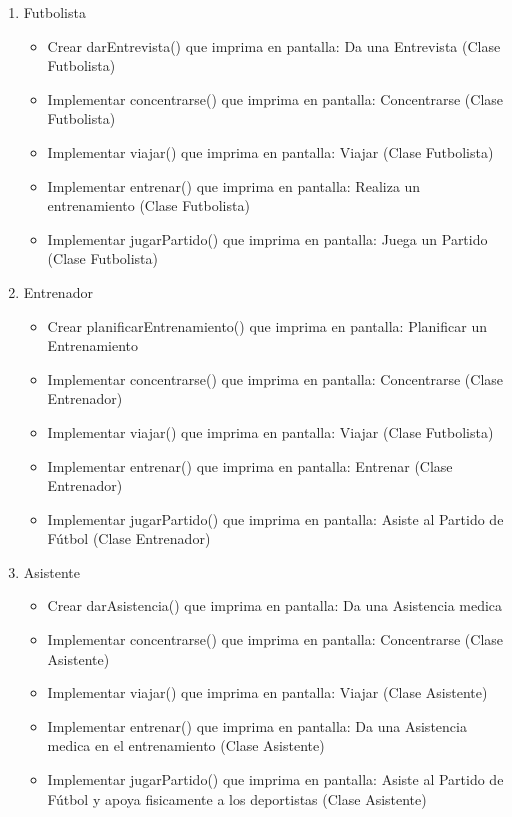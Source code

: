 \documentclass{exam}
\begin{document}
\begin{questions}
\begin{itemize}
\begin{enumerate}
  \item Futbolista
  \begin{itemize}
    \item Crear darEntrevista() que imprima en pantalla: Da una Entrevista (Clase Futbolista)
    \item Implementar concentrarse() que imprima en pantalla: Concentrarse (Clase Futbolista)
    \item Implementar viajar() que imprima en pantalla: Viajar (Clase Futbolista)
    \item Implementar entrenar() que imprima en pantalla: Realiza un entrenamiento (Clase Futbolista)
    \item Implementar jugarPartido() que imprima en pantalla: Juega un Partido (Clase Futbolista)
  \end{itemize}
  \item Entrenador
  \begin{itemize}
    \item Crear planificarEntrenamiento() que imprima en pantalla: Planificar un Entrenamiento
    \item Implementar concentrarse() que imprima en pantalla: Concentrarse (Clase Entrenador)
    \item Implementar viajar() que imprima en pantalla: Viajar (Clase Futbolista)
    \item Implementar entrenar() que imprima en pantalla: Entrenar (Clase Entrenador)
    \item Implementar jugarPartido() que imprima en pantalla: Asiste al Partido de Fútbol (Clase Entrenador)
  \end{itemize}
  \item Asistente
  \begin{itemize}
    \item Crear darAsistencia() que imprima en pantalla: Da una Asistencia medica
    \item Implementar concentrarse() que imprima en pantalla: Concentrarse (Clase Asistente)
    \item Implementar viajar() que imprima en pantalla: Viajar (Clase Asistente)
    \item Implementar entrenar() que imprima en pantalla: Da una Asistencia medica en el entrenamiento (Clase Asistente)
    \item Implementar jugarPartido() que imprima en pantalla: Asiste al Partido de Fútbol y apoya fisicamente a los deportistas (Clase Asistente)
  \end{itemize}
\end{enumerate}


\end{itemize}
\end{questions}
\end{document}
